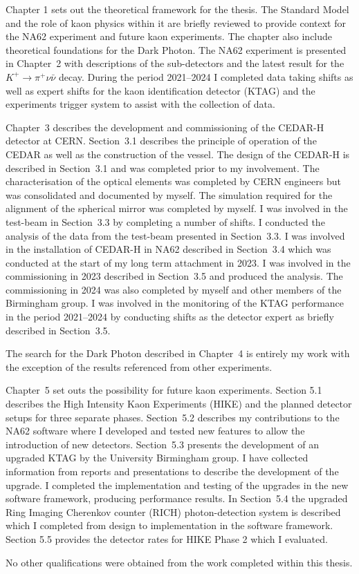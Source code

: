 %

    Chapter 1 sets out the theoretical framework for the thesis. The Standard Model and the role of kaon physics within it are briefly reviewed to provide context for the NA62 experiment and future kaon experiments. 
    The chapter also include theoretical foundations for the Dark Photon. The NA62 experiment is presented in Chapter~2 with descriptions of the sub-detectors and the latest result for the $K^+ \to \pi^+ \nu \bar{\nu}$ decay. 
    During the period 2021--2024 I completed data taking shifts as well as expert shifts for the kaon identification detector (KTAG) and the experiments trigger system to assist with the collection of data.

    Chapter~3 describes the development and commissioning of the CEDAR-H detector at CERN. Section~3.1 describes the principle of operation of the CEDAR as well as the construction of the vessel. The design of the CEDAR-H is described in Section~3.1 
    and was completed prior to my involvement. The characterisation of the optical elements was completed by CERN engineers but was consolidated and documented by myself. The simulation required for the alignment of the spherical mirror was completed by myself.
    I was involved in the test-beam in Section~3.3 by completing a number of shifts. I conducted the analysis of the data from the test-beam presented in Section~3.3. I was involved in the installation of CEDAR-H in NA62 described in Section~3.4 which was conducted at the start of my long term attachment in 2023.
    I was involved in the commissioning in 2023 described in Section~3.5 and produced the analysis. The commissioning in 2024 was also completed by myself and other members of the Birmingham group. I was involved in the monitoring of the KTAG performance in the period 2021--2024 by conducting shifts as the detector expert as briefly described in Section~3.5.

    The search for the Dark Photon described in Chapter~4 is entirely my work with the exception of the results referenced from other experiments.

    Chapter~5 set outs the possibility for future kaon experiments. Section 5.1 describes the High Intensity Kaon Experiments (HIKE) and the planned detector setups for three separate phases. Section~5.2 describes my contributions to the NA62 software where I developed and tested new features to allow the introduction of new detectors. Section~5.3 presents the development of an upgraded KTAG by the University Birmingham group. I have collected information from reports and presentations to describe the development of the upgrade.
    I completed the implementation and testing of the upgrades in the new software framework, producing performance results. 
    In Section~5.4 the upgraded Ring Imaging Cherenkov counter (RICH) photon-detection system is described which I completed from design to implementation in the software framework. Section 5.5 provides the detector rates for HIKE Phase 2 which I evaluated.

    No other qualifications were obtained from the work completed within this thesis.

